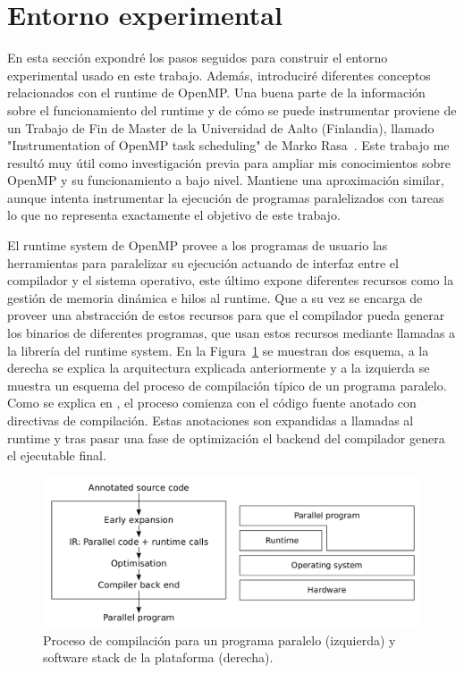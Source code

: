 \section{Entorno experimental}\label{sec:expent}

En esta sección expondré los pasos seguidos para construir el entorno experimental usado en este trabajo. Además, introduciré diferentes conceptos relacionados con el runtime de OpenMP. Una buena parte de la información sobre el funcionamiento del runtime y de cómo se puede instrumentar proviene de un Trabajo de Fin de Master de la Universidad de Aalto (Finlandia), llamado "Instrumentation of OpenMP task scheduling" de Marko Rasa~\cite{instrum-omp}. Este trabajo me resultó muy útil como investigación previa para ampliar mis conocimientos sobre OpenMP y su funcionamiento a bajo nivel. Mantiene una aproximación similar, aunque intenta instrumentar la ejecución de programas paralelizados con tareas lo que no representa exactamente el objetivo de este trabajo.

El runtime system de OpenMP provee a los programas de usuario las herramientas para paralelizar su ejecución actuando de interfaz entre el compilador y el sistema operativo, este último expone diferentes recursos como la gestión de memoria dinámica e hilos al runtime. Que a su vez se encarga de proveer una abstracción de estos recursos para que el compilador pueda generar los binarios de diferentes programas, que usan estos recursos mediante llamadas a la librería del runtime system. En la Figura~\ref{fig:compil} se muestran dos esquema, a la derecha se explica la arquitectura explicada anteriormente y a la izquierda se muestra un esquema del proceso de compilación típico de un programa paralelo. Como se explica en \cite{compproc}, el proceso comienza con el código fuente anotado con directivas de compilación. Estas anotaciones son expandidas a llamadas al runtime y tras pasar una fase de optimización el backend del compilador genera el ejecutable final. 

\begin{figure}[tbp]
    \centering
    \includegraphics[width=1\textwidth]{scheme.png}
    \caption{Proceso de compilación para un programa paralelo (izquierda) y software stack de la plataforma (derecha).}
    \label{fig:compil}
\end{figure}

